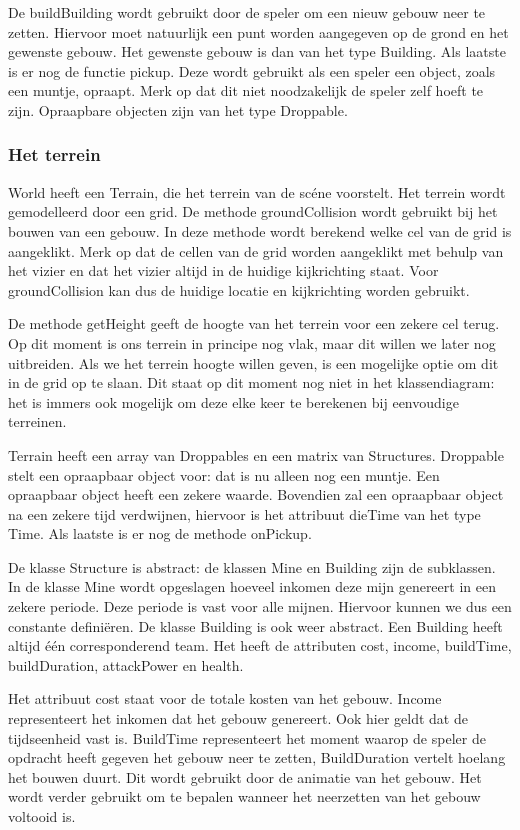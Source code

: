 \documentclass[a4paper,11pt]{article}
\begin{document}
De buildBuilding wordt gebruikt door de speler om een nieuw gebouw neer te zetten. Hiervoor moet natuurlijk een punt worden aangegeven op de grond en het gewenste gebouw. Het gewenste gebouw is dan van het type Building. Als laatste is er nog de functie pickup. Deze wordt gebruikt als een speler een object, zoals een muntje, opraapt. Merk op dat dit niet noodzakelijk de speler zelf hoeft te zijn. Opraapbare objecten zijn van het type Droppable.

\subsubsection{Het terrein}
World heeft een Terrain, die het terrein van de sc\'ene voorstelt. Het terrein wordt gemodelleerd door een grid. De methode groundCollision wordt gebruikt bij het bouwen van een gebouw. In deze methode wordt berekend welke cel van de grid is aangeklikt. Merk op dat de cellen van de grid worden aangeklikt met behulp van het vizier en dat het vizier altijd in de huidige kijkrichting staat. Voor groundCollision kan dus de huidige locatie en kijkrichting worden gebruikt.

De methode getHeight geeft de hoogte van het terrein voor een zekere cel terug. Op dit moment is ons terrein in principe nog vlak, maar dit willen we later nog uitbreiden. Als we het terrein hoogte willen geven, is een mogelijke optie om dit in de grid op te slaan. Dit staat op dit moment nog niet in het klassendiagram: het is immers ook mogelijk om deze elke keer te berekenen bij eenvoudige terreinen.

Terrain heeft een array van Droppables en een matrix van Structures. Droppable stelt een opraapbaar object voor: dat is nu alleen nog een muntje. Een opraapbaar object heeft een zekere waarde. Bovendien zal een opraapbaar object na een zekere tijd verdwijnen, hiervoor is het attribuut dieTime van het type Time. Als laatste is er nog de methode onPickup.

De klasse Structure is abstract: de klassen Mine en Building zijn de subklassen. In de klasse Mine wordt opgeslagen hoeveel inkomen deze mijn genereert in een zekere periode. Deze periode is vast voor alle mijnen. Hiervoor kunnen we dus een constante defini\"eren. De klasse Building is ook weer abstract. Een Building heeft altijd \'e\'en corresponderend team. Het heeft de attributen cost, income, buildTime, buildDuration, attackPower en health.

Het attribuut cost staat voor de totale kosten van het gebouw. Income representeert het inkomen dat het gebouw genereert. Ook hier geldt dat de tijdseenheid vast is. BuildTime representeert het moment waarop de speler de opdracht heeft gegeven het gebouw neer te zetten, BuildDuration vertelt hoelang het bouwen duurt. Dit wordt gebruikt door de animatie van het gebouw. Het wordt verder gebruikt om te bepalen wanneer het neerzetten van het gebouw voltooid is.
\end{document}
